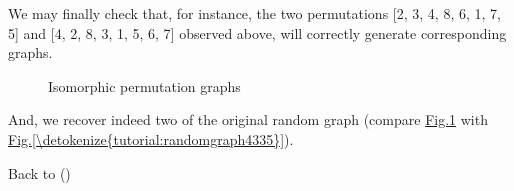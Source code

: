 \documentclass[a4paper,10pt,english]{sphinxhowto}
\let\sphinxpxdimen\pdfpxdimen\else\newdimen\sphinxpxdimen
\begin{document}
We may finally check that, for instance, the two permutations {[}2, 3, 4, 8, 6, 1, 7, 5{]} and {[}4, 2, 8, 3, 1, 5, 6, 7{]} observed above, will correctly generate corresponding  graphs.

\begin{sphinxVerbatim}[commandchars=\\\{\},numbers=left,firstnumber=1,stepnumber=1]
  \PYG{p}{[}       \PYG{p}{]}
  \PYG{p}{[}       \PYG{p}{]}
\end{sphinxVerbatim}

\begin{figure}[htbp]
\centering
\capstart

\noindent\sphinxincludegraphics[width=700\sphinxpxdimen]{{isomorphicPerms}.png}
\caption{Isomorphic permutation graphs}\label{\detokenize{tutorial:isomorphicpermgraphs}}\end{figure}

And, we recover indeed two  of the original random graph (compare \hyperref[\detokenize{tutorial:isomorphicpermgraphs}]{Fig.\@ \ref{\detokenize{tutorial:isomorphicpermgraphs}}} with \hyperref[\detokenize{tutorial:randomgraph4335}]{Fig.\@ \ref{\detokenize{tutorial:randomgraph4335}}}).

Back to {\hyperref[\detokenize{tutorial:tutorial-label}]{}} ()
\end{document}
